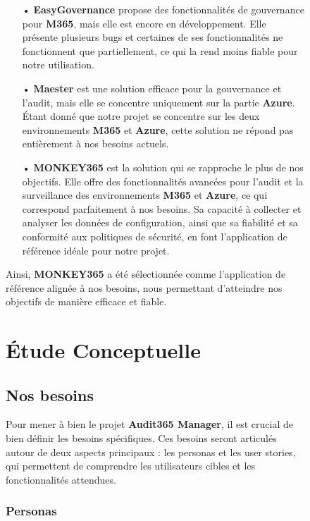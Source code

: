 \begin{figure}[H]
\begin{itemize}
\item[•] \textbf{EasyGovernance} propose des fonctionnalités de gouvernance pour \textbf{M365}, mais elle est encore en développement. Elle présente plusieurs bugs et certaines de ses fonctionnalités ne fonctionnent que partiellement, ce qui la rend moins fiable pour notre utilisation.

\item[•] \textbf{Maester} est une solution efficace pour la gouvernance et l'audit, mais elle se concentre uniquement sur la partie \textbf{Azure}. Étant donné que notre projet se concentre sur les deux environnements \textbf{M365} et \textbf{Azure}, cette solution ne répond pas entièrement à nos besoins actuels.

\item[•] \textbf{MONKEY365} est la solution qui se rapproche le plus de nos objectifs. Elle offre des fonctionnalités avancées pour l'audit et la surveillance des environnements \textbf{M365} et \textbf{Azure}, ce qui correspond parfaitement à nos besoins. Sa capacité à collecter et analyser les données de configuration, ainsi que sa fiabilité et sa conformité aux politiques de sécurité, en font l'application de référence idéale pour notre projet.
\end{itemize}
\vspace{0.1cm}
Ainsi, \textbf{MONKEY365} a été sélectionnée comme l'application de référence alignée à nos besoins, nous permettant d'atteindre nos objectifs de manière efficace et fiable.

\section{Étude Conceptuelle}

\subsection{Nos besoins}

Pour mener à bien le projet \textbf{Audit365 Manager}, il est crucial de bien définir les besoins spécifiques. Ces besoins seront articulés autour de deux aspects principaux : les personas et les user stories, qui permettent de comprendre les utilisateurs cibles et les fonctionnalités attendues.

\subsubsection{Personas}


\end{figure}
